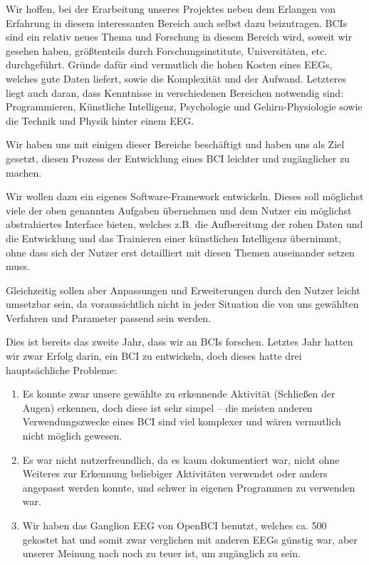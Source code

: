 \documentclass[10pt]{article}
\begin{document}
	
Wir hoffen, bei der Erarbeitung unseres Projektes neben dem Erlangen von Erfahrung in diesem interessanten Bereich auch selbst dazu beizutragen.
BCIs sind ein relativ neues Thema und Forschung in diesem Bereich wird, soweit wir gesehen haben, größtenteils durch Forschungsinstitute, Universitäten, etc. durchgeführt.
Gründe dafür sind vermutlich die hohen Kosten eines EEGs, welches gute Daten liefert, sowie die Komplexität und der Aufwand.
Letzteres liegt auch daran, dass Kenntnisse in verschiedenen Bereichen notwendig sind: Programmieren, Künstliche Intelligenz, Psychologie und Gehirn-Physiologie sowie die Technik und Physik hinter einem EEG.

Wir haben uns mit einigen dieser Bereiche beschäftigt und haben uns als Ziel gesetzt, diesen Prozess der Entwicklung eines BCI leichter und zugänglicher zu machen.

Wir wollen dazu ein eigenes Software-Framework entwickeln. 
Dieses soll möglichst viele der oben genannten Aufgaben übernehmen und dem Nutzer ein möglichst abstrahiertes Interface bieten, welches z.B. die Aufbereitung der rohen Daten und die Entwicklung und das Trainieren einer künstlichen Intelligenz übernimmt, ohne dass sich der Nutzer erst detailliert mit diesen Themen auseinander setzen muss.

Gleichzeitig sollen aber Anpassungen und Erweiterungen durch den Nutzer leicht umsetzbar sein, da voraussichtlich nicht in jeder Situation die von uns gewählten Verfahren und Parameter passend sein werden.

Dies ist bereits das zweite Jahr, dass wir an BCIs forschen.
Letztes Jahr hatten wir zwar Erfolg darin, ein BCI zu entwickeln, doch dieses hatte drei hauptsächliche Probleme:

\begin{enumerate}
    \item Es konnte zwar unsere gewählte zu erkennende Aktivität (Schließen der Augen) erkennen, doch diese ist sehr simpel -- die meisten anderen Verwendungszwecke eines BCI sind viel komplexer und wären vermutlich nicht möglich gewesen.
    \item Es war nicht nutzerfreundlich, da es kaum dokumentiert war, nicht ohne Weiteres zur Erkennung beliebiger Aktivitäten verwendet oder anders angepasst werden konnte, und schwer in eigenen Programmen zu verwenden war.
    \item Wir haben das Ganglion EEG von OpenBCI benutzt, welches ca. \SI{500}{\eur} gekostet hat und somit zwar verglichen mit anderen EEGs günstig war, aber unserer Meinung nach noch zu teuer ist, um zugänglich zu sein.
\end{enumerate}
\end{document}
